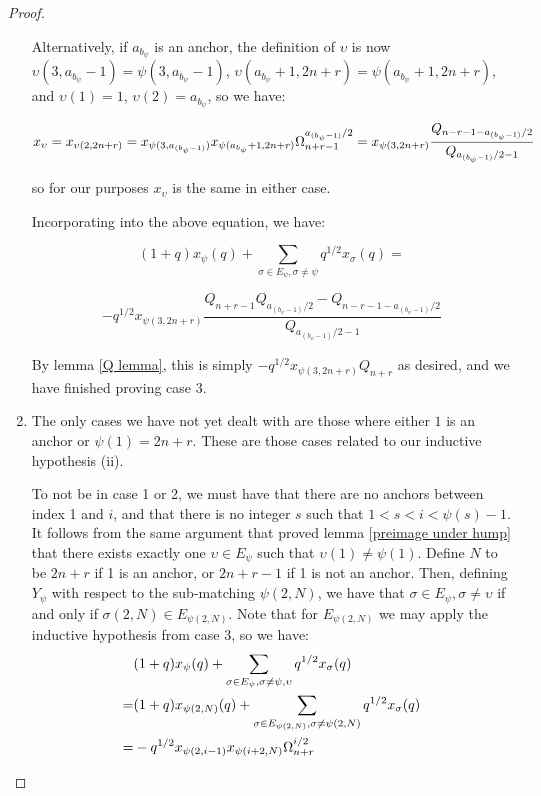 \documentclass{amsart}
\begin{document}
\begin{proof}
\begin{enumerate}[label={\textit{Case \arabic*.}}]
 		Alternatively, if $a_{b_\psi}$ is an anchor, the definition of $\upsilon$ is now $\upsilon(3,a_{b_\psi}-1)=\psi(3,a_{b_\psi}-1)$, $\upsilon(a_{b_\psi}+1,2n+r)=\psi(a_{b_\psi}+1,2n+r)$, and $\upsilon(1)=1$, $\upsilon(2)=a_{b_\psi}$, so we have:
 		
 		$$x_\upsilon=x_{\upsilon(2,2n+r)}=x_{\psi(3,a_{(b_\psi-1)})}x_{\psi(a_{b_\psi}+1,2n+r)}\Omega_{n+r-1}^{a_{(b_\psi-1)}/2}=x_{\psi(3,2n+r)}\frac{Q_{n-r-1-a_{(b_\psi-1)}/2}}{Q_{a_{(b_\psi-1)}/2-1}}$$
 		
 		so for our purposes $x_\upsilon$ is the same in either case.
 		
 		Incorporating into the above equation, we have:
 		
 		$$(1+q)x_\psi(q)+\sum_{\sigma\in E_\psi,\sigma\not=\psi}q^{1/2}x_\sigma(q)=$$
 		
 		
 		$$-q^{1/2}x_{\psi(3,2n+r)}\frac{Q_{n+r-1}Q_{a_{(b_\psi-1)}/2}-Q_{n-r-1-a_{(b_\psi-1)}/2}}{Q_{a_{(b_\psi-1)}/2-1}}$$	
 		
 		By lemma \ref{Q lemma}, this is simply $-q^{1/2}x_{\psi(3,2n+r)}Q_{n+r}$ as desired, and we have finished proving case 3.
 		\\
 		
 		\item The only cases we have not yet dealt with are those where either $1$ is an anchor or $\psi(1)=2n+r$. These are those cases related to our inductive hypothesis (ii).
 		
 		To not be in case 1 or 2, we must have that there are no anchors between index 1 and $i$, and that there is no integer $s$ such that $1<s<i<\psi(s)-1$. It follows from the same argument that proved lemma \ref{preimage under hump} that there exists exactly one $\upsilon\in E_\psi$ such that $\upsilon(1)\not=\psi(1)$. Define $N$ to be $2n+r$ if 1 is an anchor, or $2n+r-1$ if 1 is not an anchor. Then, defining $Y_\psi$ with respect to the sub-matching $\psi(2,N)$, we have that $\sigma\in E_\psi, \sigma\not=\upsilon$ if and only if $\sigma(2,N)\in E_{\psi(2,N)}$. Note that for $E_{\psi(2,N)}$ we may apply the inductive hypothesis from case 3, so we have:
 		\begin{align*}
 			&(1+q)x_\psi(q)+\sum_{\sigma\in E_\psi,\sigma\not=\psi,\upsilon}q^{1/2}x_\sigma(q)\\
 			=&(1+q)x_{\psi(2,N)}(q)+\sum_{\sigma\in E_{\psi(2,N)},\sigma\not=\psi(2,N)}q^{1/2}x_{\sigma}(q)\\
 			=&-q^{1/2}x_{\psi(2,i-1)}x_{\psi(i+2,N)}\Omega_{n+r}^{i/2}
 		\end{align*}
 		

\end{enumerate}
\end{proof}
\end{document}
